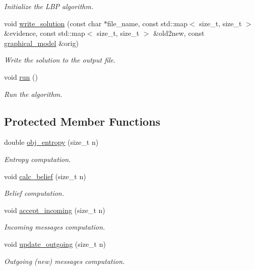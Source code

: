 \begin{DoxyCompactItemize}
\begin{DoxyCompactList}\small\item\em Initialize the L\+BP algorithm. \end{DoxyCompactList}\item 
void \hyperlink{classmerlin_1_1lbp_ad6e56e73dd550f3580b4910536367a52}{write\+\_\+solution} (const char $\ast$file\+\_\+name, const std\+::map$<$ size\+\_\+t, size\+\_\+t $>$ \&evidence, const std\+::map$<$ size\+\_\+t, size\+\_\+t $>$ \&old2new, const \hyperlink{classmerlin_1_1graphical__model}{graphical\+\_\+model} \&orig)
\begin{DoxyCompactList}\small\item\em Write the solution to the output file. \end{DoxyCompactList}\item 
void \hyperlink{classmerlin_1_1lbp_afa31a31b0cfd63590d57cb453a6ab751}{run} ()
\begin{DoxyCompactList}\small\item\em Run the algorithm. \end{DoxyCompactList}\end{DoxyCompactItemize}
\subsection*{Protected Member Functions}
\begin{DoxyCompactItemize}
\item 
double \hyperlink{classmerlin_1_1lbp_a7970c64fc5ea704345d85bbdeda483ff}{obj\+\_\+entropy} (size\+\_\+t n)
\begin{DoxyCompactList}\small\item\em Entropy computation. \end{DoxyCompactList}\item 
void \hyperlink{classmerlin_1_1lbp_a48e9c7a9302829c21e6fd26f425e0237}{calc\+\_\+belief} (size\+\_\+t n)
\begin{DoxyCompactList}\small\item\em Belief computation. \end{DoxyCompactList}\item 
void \hyperlink{classmerlin_1_1lbp_a861d70a75592462bfe44aed5eda6407a}{accept\+\_\+incoming} (size\+\_\+t n)
\begin{DoxyCompactList}\small\item\em Incoming messages computation. \end{DoxyCompactList}\item 
void \hyperlink{classmerlin_1_1lbp_a05d07707c1eb9824c0e762ab0a3d80be}{update\+\_\+outgoing} (size\+\_\+t n)
\begin{DoxyCompactList}\small\item\em Outgoing (new) messages computation. \end{DoxyCompactList}\end{DoxyCompactItemize}
